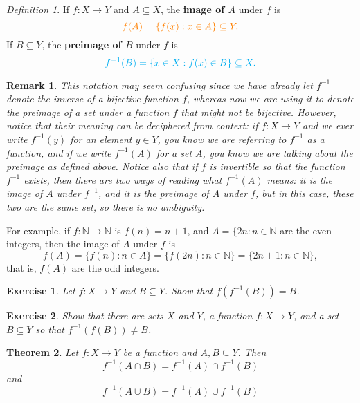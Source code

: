 \documentclass[a4paper,12pt,dvipsnames]{book}
\newtheorem{theorem}{Theorem}
\newtheorem{remark}{Remark}
\newtheorem{exercise}{Exercise}
\numberwithin{theorem}{chapter}
\theoremstyle{remark}
\newtheorem{definition}[theorem]{Definition}
\begin{document}
\begin{definition}
If $f:X\rightarrow Y$ and $A\subseteq X$,  the  {\bf \color{orange} image of $A$} under $f$ is  
\[
 { \color{orange} f(A)=\{f(x):x\in A\} \subseteq Y.}
\]
If $B\subseteq Y$, the  {\bf \color{cyan} preimage of $B$} under $f$ is
\[
{ \color{cyan} f^{-1}(B)=\{x\in X: f(x)\in B\} \subseteq X. }
\]
\end{definition}

\begin{remark}
This notation may seem confusing since we have already let $f^{-1}$ denote the inverse of a bijective function $f$, whereas now we are using it to denote the preimage of a set under a function $f$ that might not be bijective. However, notice that their meaning can be deciphered from context: if $f:X\rightarrow Y$ and we ever write $f^{-1}(y)$ for an {\it element} $y\in Y$, you know we are referring to $f^{-1}$ as a function, and if we write $f^{-1}(A)$ for a {\it set $A$}, you know we are talking about the preimage as defined above. Notice also that if $f$ is invertible so that the function $f^{-1}$ exists, then there are two ways of reading what $f^{-1}(A)$ means: it is the image of $A$ under $f^{-1}$, and it is the preimage of $A$ under $f$, but in this case, these two are the same set, so there is no ambiguity.


\end{remark}


For example, if $f:\mathbb{N}\rightarrow \mathbb{N}$ is $f(n)=n+1$, and $A=\{2n:n\in\mathbb{N}$ are the even integers, then the image of $A$ under $f$ is 
\[
f(A)=\{f(n):n\in A\} = \{f(2n): n\in\mathbb{N}\} = \{2n+1:n\in\mathbb{N}\},\]
that is, $f(A)$ are the odd integers. 


\begin{exercise}
Let $f:X\rightarrow Y$ and $B\subseteq Y$. Show that $f(f^{-1}(B))=B$. 
\end{exercise}

\begin{exercise}
Show that there are sets $X$ and $Y$, a function $f:X\rightarrow Y$, and a set $B\subseteq Y$ so that $f^{-1}(f(B))\neq B$.
\end{exercise}


\begin{theorem}
Let $f:X\rightarrow Y$ be a function and $A,B\subseteq Y$. Then
\[
f^{-1}(A\cap B)=f^{-1}(A)\cap f^{-1}(B)
\]
and 
\[
f^{-1}(A\cup B)=f^{-1}(A)\cup f^{-1}(B)
\]
\end{theorem}
\end{document}
